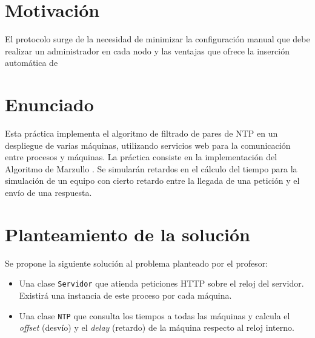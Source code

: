 \documentclass{article}
\title{\titulo}
\author{\autor}
\date{\today} %
\newcommand{\nombre}{Patata}
\begin{document}
\maketitle

\begin{abstract}
El protocolo \nombre permite el descubrimiento de máquinas ofreciendo una serie de servicios consumibles por el sistema distribuido, permitiendo publicar y solicitar nodos, obtener información del estado de nodos y una serie de funcionalidades de diagnóstico.
\end{abstract}

\section{Motivación}

El protocolo surge de la necesidad de minimizar la configuración manual que debe realizar un administrador en cada nodo y las ventajas que ofrece la inserción automática de 

%
%
\section{Enunciado}

Esta práctica implementa el algoritmo de filtrado de pares de NTP en un despliegue de varias máquinas, utilizando servicios web para la comunicación entre procesos y máquinas. La práctica consiste en la implementación del Algoritmo de Marzullo \cite{marzullo84}. Se simularán retardos en el cálculo del tiempo para la simulación de un equipo con cierto retardo entre la llegada de una petición y el envío de una respuesta.


\section{Planteamiento de la solución}

Se propone la siguiente solución al problema planteado por el profesor:

\begin{itemize}
  \item Una clase \verb+Servidor+ que atienda peticiones HTTP sobre el reloj del servidor. Existirá una instancia de este proceso por cada máquina.
  \item Una clase \verb+NTP+ que consulta los tiempos a todas las máquinas y calcula el \textit{offset} (desvío) y el \textit{delay} (retardo) de la máquina respecto al reloj interno.
\end{itemize}
\end{document}
